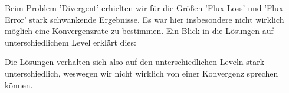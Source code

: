\documentclass[12pt,a4paper]{scrartcl}
\numberwithin{equation}{section}
\begin{document}
\begin{enumerate}[label=(\roman*)]
\begin{figure}[H]
\end{figure}
Beim Problem 'Divergent' erhielten wir für die Größen 'Flux Loss' und 'Flux Error' stark schwankende Ergebnisse. Es war hier insbesondere nicht wirklich möglich eine Konvergenzrate zu bestimmen. Ein Blick in die Lösungen auf unterschiedlichem Level erklärt dies:
\begin{figure}[H]
	\centering
\end{figure}

Die Lösungen verhalten sich also auf den unterschiedlichen Leveln stark unterschiedlich, weswegen wir nicht wirklich von einer Konvergenz sprechen können.


\end{enumerate}
\end{document}
